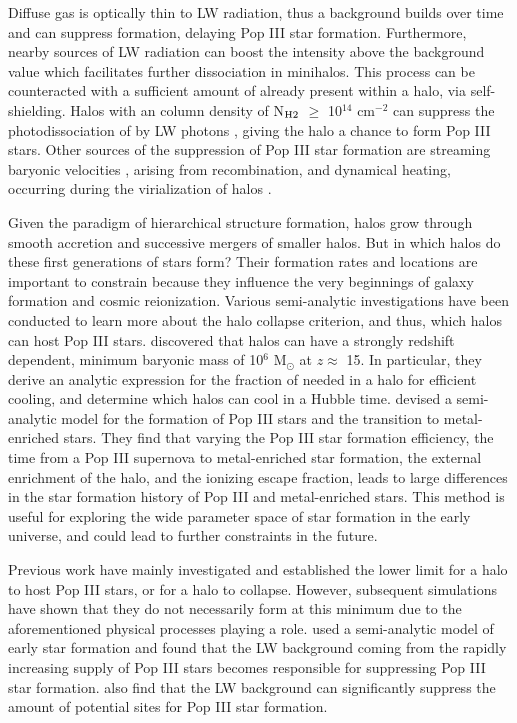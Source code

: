 \documentclass[a4paper,fleqn,usenatbib]{mnras}
\begin{document}
Diffuse gas is optically thin to LW radiation, thus a background builds over time and can suppress \hh{} formation, delaying Pop III star formation. Furthermore, nearby sources of LW radiation can boost the intensity above the background value which facilitates further \hh{} dissociation in minihalos. This process can be counteracted with a sufficient amount of \hh{} already present within a halo, via \hh{} self-shielding. Halos with an \hh{} column density of N$_{\rm H2}$ $\geq$ 10$^{14}$ cm$^{-2}$ can suppress the photodissociation of \hh{} by LW photons \citep{Draine96}, giving the halo a chance to form Pop III stars. Other sources of the suppression of Pop III star formation are streaming baryonic velocities \citep{Tselia11, Greif11_Delay, Naoz12,OLeary12}, arising from recombination, and dynamical heating, occurring during the virialization of halos \citep{Yoshida03, Fernandez14}. 

Given the paradigm of hierarchical structure formation, halos grow through smooth accretion and successive mergers of smaller halos. But in which halos do these first generations of stars form? Their formation rates and locations are important to constrain because they influence the very beginnings of galaxy formation and cosmic reionization. Various semi-analytic investigations have been conducted to learn more about the halo collapse criterion, and thus, which halos can host Pop III stars. \citet{Tegmark97} discovered that halos can have a strongly redshift dependent, minimum baryonic mass of 10$^{6}$ M$_{\odot}$ at $z \approx$ 15. In particular, they derive an analytic expression for the fraction of \hh{} needed in a halo for efficient cooling, and determine which  halos can cool in a Hubble time. \citet{Visbal18} devised a semi-analytic model for the formation of Pop III stars and the transition to metal-enriched stars. They find that varying the Pop III star formation efficiency, the time from a Pop III supernova to metal-enriched star formation, the external enrichment of the halo, and the ionizing escape fraction, leads to large differences in the star formation history of Pop III and metal-enriched stars. This method is useful for exploring the wide parameter space of star formation in the early universe, and could lead to further constraints in the future. 

Previous work have mainly investigated and established the lower limit for a halo to host Pop III stars, or for a halo to collapse. However, subsequent simulations have shown that they do not necessarily form at this minimum due to the aforementioned physical processes playing a role. \citet{Mebane18} used a semi-analytic model of early star formation and found that the LW background coming from the rapidly increasing supply of Pop III stars becomes responsible for suppressing Pop III star formation. \citet{Griffen18} also find that the LW background can significantly suppress the amount of potential sites for Pop III star formation. 
\end{document}
